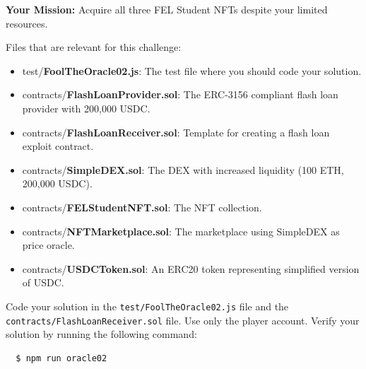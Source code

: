 \documentclass[12pt]{article}
\begin{document}
\medskip
\noindent
\textbf{Your Mission:} Acquire all three FEL Student NFTs despite your limited resources.

Files that are relevant for this challenge:
\begin{itemize}
\item test/\textbf{FoolTheOracle02.js}: The test file where you should code your solution.
\item contracts/\textbf{FlashLoanProvider.sol}: The ERC-3156 compliant flash loan provider with 200,000 USDC.
\item contracts/\textbf{FlashLoanReceiver.sol}: Template for creating a flash loan exploit contract.
\item contracts/\textbf{SimpleDEX.sol}: The DEX with increased liquidity (100 ETH, 200,000 USDC).
\item contracts/\textbf{FELStudentNFT.sol}: The NFT collection.
\item contracts/\textbf{NFTMarketplace.sol}: The marketplace using SimpleDEX as price oracle.
\item contracts/\textbf{USDCToken.sol}: An ERC20 token representing simplified version of USDC.
\end{itemize}

\noindent
Code your solution in the \texttt{test/FoolTheOracle02.js} file and the \\ \texttt{contracts/FlashLoanReceiver.sol} file. Use only the player account. Verify your solution by running the following command:

\begin{verbatim}
  $ npm run oracle02
\end{verbatim}
\end{document}
